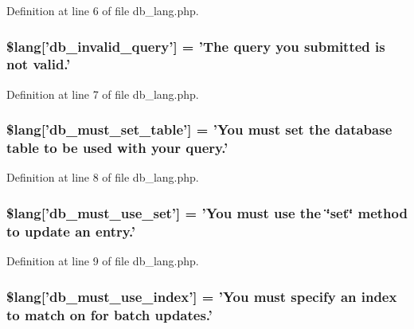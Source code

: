 Definition at line 6 of file db\-\_\-lang.\-php.

\hypertarget{db__lang_8php_a2cbf4ee929f45a29a0dcf21280bad485}{
\subsubsection[{\$lang}]{\setlength{\rightskip}{0pt plus 5cm}\$lang\mbox{[}'db\-\_\-invalid\-\_\-query'\mbox{]} = 'The query you submitted is {\bf not} valid.'}}\label{db__lang_8php_a2cbf4ee929f45a29a0dcf21280bad485}


Definition at line 7 of file db\-\_\-lang.\-php.

\hypertarget{db__lang_8php_a0f5d469f071f2b5327b44761f4a06396}{
\subsubsection[{\$lang}]{\setlength{\rightskip}{0pt plus 5cm}\$lang\mbox{[}'db\-\_\-must\-\_\-set\-\_\-table'\mbox{]} = 'You must set the database table {\bf to} be used with your query.'}}\label{db__lang_8php_a0f5d469f071f2b5327b44761f4a06396}


Definition at line 8 of file db\-\_\-lang.\-php.

\hypertarget{db__lang_8php_a55e22fb14cedc8ee7f70980bf7f37308}{
\subsubsection[{\$lang}]{\setlength{\rightskip}{0pt plus 5cm}\$lang\mbox{[}'db\-\_\-must\-\_\-use\-\_\-set'\mbox{]} = 'You must use the \char`\"{}set\char`\"{} method {\bf to} update an entry.'}}\label{db__lang_8php_a55e22fb14cedc8ee7f70980bf7f37308}


Definition at line 9 of file db\-\_\-lang.\-php.

\hypertarget{db__lang_8php_a708419b6b94728c30474ee5fdde3b99b}{
\subsubsection[{\$lang}]{\setlength{\rightskip}{0pt plus 5cm}\$lang\mbox{[}'db\-\_\-must\-\_\-use\-\_\-index'\mbox{]} = 'You must specify an index {\bf to} match on {\bf for} batch updates.'}}\label{db__lang_8php_a708419b6b94728c30474ee5fdde3b99b}


